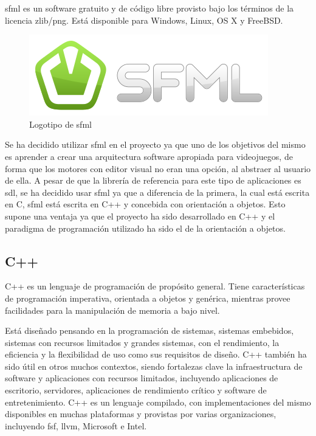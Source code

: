 		\acrshort{sfml} es un software gratuito y de código libre provisto bajo los términos de la licencia zlib/png. Está disponible para Windows, Linux, OS X y FreeBSD.

		\begin{figure}[!htp]
			 \centering
			 \includegraphics{fig/sfml}
			 \caption{Logotipo de \acrshort{sfml}}
			 \label{fig:sfml}
		\end{figure}

		Se ha decidido utilizar \acrshort{sfml} en el proyecto ya que uno de los objetivos del mismo es aprender a crear una arquitectura software apropiada para videojuegos, de forma que los motores con editor visual no eran una opción, al abstraer al usuario de ella. A pesar de que la librería de referencia para este tipo de aplicaciones es \acrshort{sdl}, se ha decidido usar \acrshort{sfml} ya que a diferencia de la primera, la cual está escrita en C, \acrshort{sfml} está escrita en C++ y concebida con orientación a objetos. Esto supone una ventaja ya que el proyecto ha sido desarrollado en C++ y el paradigma de programación utilizado ha sido el de la orientación a objetos.

	\subsection{C++}

		C++ es un lenguaje de programación de propósito general. Tiene características de programación imperativa, orientada a objetos y genérica, mientras provee facilidades para la manipulación de memoria a bajo nivel.

		Está diseñado pensando en la programación de sistemas, sistemas embebidos, sistemas con recursos limitados y grandes sistemas, con el rendimiento, la eficiencia y la flexibilidad de uso como sus requisitos de diseño. C++ también ha sido útil en otros muchos contextos, siendo fortalezas clave la infraestructura de software y aplicaciones con recursos limitados, incluyendo aplicaciones de escritorio, servidores, aplicaciones de rendimiento crítico y software de entretenimiento. C++ es un lenguaje compilado, con implementaciones del mismo disponibles en muchas plataformas y provistas por varias organizaciones, incluyendo \acrshort{fsf}, \acrshort{llvm}, Microsoft e Intel.

